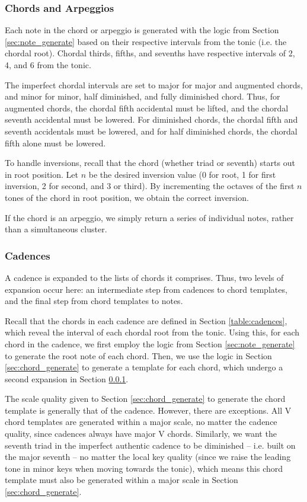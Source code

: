 \documentclass{article}
\begin{document}
\subsubsection{Chords and Arpeggios}
\label{sec:chord_expansion}
Each note in the chord or arpeggio is generated with the logic from Section \ref{sec:note_generate} based on their respective intervals from the tonic (i.e. the chordal root). Chordal thirds, fifths, and sevenths have respective intervals of 2, 4, and 6 from the tonic. 

The imperfect chordal intervals are set to major for major and augmented chords, and minor for minor, half diminished, and fully diminished chord. Thus, for augmented chords, the chordal fifth accidental must be lifted, and the chordal seventh accidental must be lowered. For diminished chords, the chordal fifth and seventh accidentals must be lowered, and for half diminished chords, the chordal fifth alone must be lowered.

To handle inversions, recall that the chord (whether triad or seventh) starts out in root position. Let $n$ be the desired inversion value (0 for root, 1 for first inversion, 2 for second,  and 3 or third). By incrementing the octaves of the first $n$ tones of the chord in root position, we obtain the correct inversion. 

If the chord is an arpeggio, we simply return a series of individual notes, rather than a simultaneous cluster.

\subsubsection{Cadences}
A cadence is expanded to the lists of chords it comprises. Thus, two levels of expansion occur here: an intermediate step from cadences to chord templates, and the final step from chord templates to notes.

Recall that the chords in each cadence are defined in Section \ref{table:cadences}, which reveal the interval of each chordal root from the tonic. Using this, for each chord in the cadence, we first employ the logic from Section \ref{sec:note_generate} to generate the root note of each chord. Then, we use the logic in Section \ref{sec:chord_generate} to generate a template for each chord, which undergo a second expansion in Section \ref{sec:chord_expansion}. 

The scale quality given to Section \ref{sec:chord_generate} to generate the chord template is generally that of the cadence. However, there are exceptions. All V chord templates are generated within a major scale, no matter the cadence quality, since cadences always have major V chords. Similarly, we want the seventh triad in the imperfect authentic cadence to be diminished  -- i.e. built on the major seventh -- no matter the local key quality (since we raise the leading tone in minor keys when moving towards the tonic), which means this chord template must also be generated within a major scale in Section \ref{sec:chord_generate}. 
\end{document}
